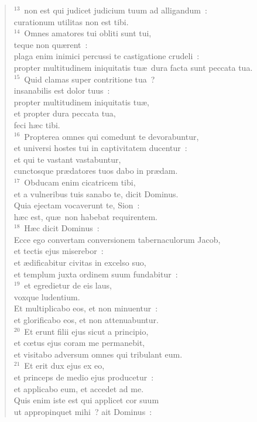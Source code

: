 \begin{flushleft}
\begin{verse}
${}^{13}$~non est qui judicet judicium tuum ad alligandum~:\\ curationum utilitas non est tibi.\\
${}^{14}$~Omnes amatores tui obliti sunt tui,\\ teque non qu\ae rent~:\\ plaga enim inimici percussi te castigatione crudeli~:\\ propter multitudinem iniquitatis tu\ae\ dura facta sunt peccata tua.\\
${}^{15}$~Quid clamas super contritione tua~?\\ insanabilis est dolor tuus~:\\ propter multitudinem iniquitatis tu\ae ,\\ et propter dura peccata tua,\\ feci h\ae c tibi.\\
${}^{16}$~Propterea omnes qui comedunt te devorabuntur,\\ et universi hostes tui in captivitatem ducentur~:\\ et qui te vastant vastabuntur,\\ cunctosque pr\ae datores tuos dabo in pr\ae dam.\\
${}^{17}$~Obducam enim cicatricem tibi,\\ et a vulneribus tuis sanabo te, dicit Dominus.\\ Quia ejectam vocaverunt te, Sion~:\\ h\ae c est, qu\ae\ non habebat requirentem.\\
${}^{18}$~H\ae c dicit Dominus~:\\ Ecce ego convertam conversionem tabernaculorum Jacob,\\ et tectis ejus miserebor~:\\ et \ae dificabitur civitas in excelso suo,\\ et templum juxta ordinem suum fundabitur~:\\
${}^{19}$~et egredietur de eis laus,\\ voxque ludentium.\\ Et multiplicabo eos, et non minuentur~:\\ et glorificabo eos, et non attenuabuntur.\\
${}^{20}$~Et erunt filii ejus sicut a principio,\\ et cœtus ejus coram me permanebit,\\ et visitabo adversum omnes qui tribulant eum.\\
${}^{21}$~Et erit dux ejus ex eo,\\ et princeps de medio ejus producetur~:\\ et applicabo eum, et accedet ad me.\\ Quis enim iste est qui applicet cor suum\\ ut appropinquet mihi~? ait Dominus~:\\

\end{verse}
\end{flushleft}
